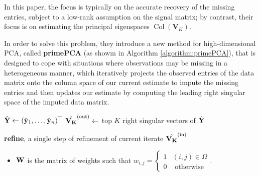 \documentclass[a4paper,12pt,authoryear]{elegantpaper}
\begin{document}
    In this paper, the focus is typically on the accurate recovery of the missing entries, subject to a low-rank assumption on the signal matrix; by contrast, their focus is on estimating the principal eigenspaces $\operatorname{Col}\left(\mathbf{V}_{K}\right)$.

    In order to solve this problem, they introduce a new method for high-dimensional PCA, called \textbf{primePCA} (as showm in Algorithm \ref{algorithm:primePCA}), that is designed to cope with situations where observations may be missing in a heterogeneous manner, which iteratively projects the observed entries of the data matrix onto the column space of our current estimate to impute the missing entries and then updates our estimate by computing the leading right singular space of the imputed data matrix.

    \begin{algorithm}[H]
        $\hat{\bf Y} \leftarrow (\hat{\bf y}_{1}, \ldots, \hat{\bf y}_{n})^{\top}$\;
        $\hat{\bf V_{K}}^{(\mathrm{out})}\leftarrow$ top $K$ right singular vectors of $\hat{\bf Y}$\;
        \caption{\textbf{refine}, a single step of refinement of current iterate $\hat{\bf V_{K}}^{(\mathrm{in})}$ \citep{zhu_high-dimensional_2019}}
        \label{algorithm:refine}
    \end{algorithm}
    \begin{itemize}
        \item $\bf W$ is the matrix of weights such that $w_{i,j}=\left\{\begin{array}{ll}
            1 & (i, j) \in \Omega \\
            0 & \text { otherwise }
            \end{array}\right.$.
    \end{itemize}
    
\end{document}

